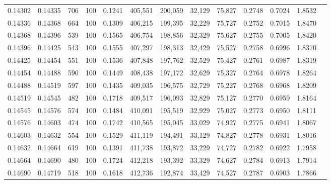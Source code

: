 \begin{tabular}{rrrrrrrrrrrrr}
0.14302 & 0.14335 &   706 & 100 &                                     0.1241 & 405,551 & 200,059 &  32,129 &  75,827 & 0.2748 & 0.7024 & 1.8532 \\
0.14336 & 0.14368 &   664 & 100 &                                     0.1309 & 406,215 & 199,395 &  32,229 &  75,727 & 0.2752 & 0.7015 & 1.8470 \\
0.14368 & 0.14396 &   539 & 100 &                                     0.1565 & 406,754 & 198,856 &  32,329 &  75,627 & 0.2755 & 0.7005 & 1.8420 \\
0.14396 & 0.14425 &   543 & 100 &                                     0.1555 & 407,297 & 198,313 &  32,429 &  75,527 & 0.2758 & 0.6996 & 1.8370 \\
0.14425 & 0.14454 &   551 & 100 &                                     0.1536 & 407,848 & 197,762 &  32,529 &  75,427 & 0.2761 & 0.6987 & 1.8319 \\
0.14454 & 0.14488 &   590 & 100 &                                     0.1449 & 408,438 & 197,172 &  32,629 &  75,327 & 0.2764 & 0.6978 & 1.8264 \\
0.14488 & 0.14519 &   597 & 100 &                                     0.1435 & 409,035 & 196,575 &  32,729 &  75,227 & 0.2768 & 0.6968 & 1.8209 \\
0.14519 & 0.14545 &   482 & 100 &                                     0.1718 & 409,517 & 196,093 &  32,829 &  75,127 & 0.2770 & 0.6959 & 1.8164 \\
0.14545 & 0.14576 &   574 & 100 &                                     0.1484 & 410,091 & 195,519 &  32,929 &  75,027 & 0.2773 & 0.6950 & 1.8111 \\
0.14576 & 0.14603 &   474 & 100 &                                     0.1742 & 410,565 & 195,045 &  33,029 &  74,927 & 0.2775 & 0.6941 & 1.8067 \\
0.14603 & 0.14632 &   554 & 100 &                                     0.1529 & 411,119 & 194,491 &  33,129 &  74,827 & 0.2778 & 0.6931 & 1.8016 \\
0.14632 & 0.14664 &   619 & 100 &                                     0.1391 & 411,738 & 193,872 &  33,229 &  74,727 & 0.2782 & 0.6922 & 1.7958 \\
0.14664 & 0.14690 &   480 & 100 &                                     0.1724 & 412,218 & 193,392 &  33,329 &  74,627 & 0.2784 & 0.6913 & 1.7914 \\
0.14690 & 0.14719 &   518 & 100 &                                     0.1618 & 412,736 & 192,874 &  33,429 &  74,527 & 0.2787 & 0.6903 & 1.7866 \\

\end{tabular}
